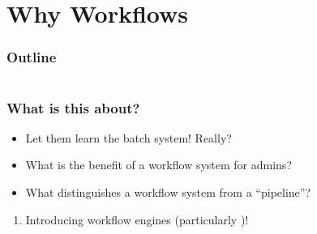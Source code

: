 \section{Why Workflows}

\begin{frame}
    \frametitle{Outline}
    \begin{columns}[t]
        \begin{column}{.5\textwidth}
            \tableofcontents[sections={1-7},currentsection]
        \end{column}
        \begin{column}{.5\textwidth}
            \tableofcontents[sections={8-15},currentsection]
        \end{column}
    \end{columns}
\end{frame}

\begin{frame}
  \frametitle{What is this about?}
   \begin{question}[Questions]
   	 \begin{itemize}
        \item Let them learn the batch system! Really?
        \item What is the benefit of a workflow system for admins?
        \item What distinguishes a workflow system from a ``pipeline''?
     \end{itemize}
   \end{question}
   \begin{docs}[Objectives]
   	  \begin{enumerate}
         \item Introducing workflow engines (particularly \Snakemake)!
      \end{enumerate}
   \end{docs}
\end{frame}  

